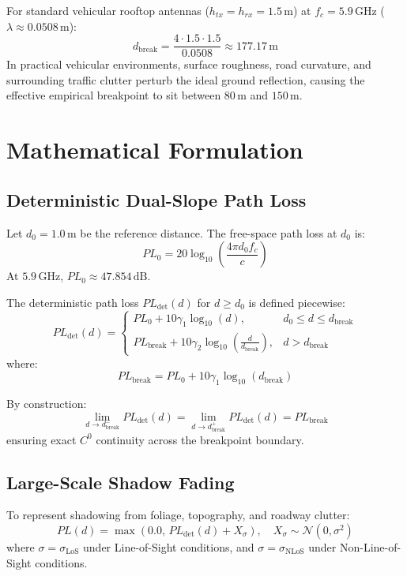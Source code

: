\documentclass[11pt,a4paper]{article}
\begin{document}
For standard vehicular rooftop antennas ($h_{tx} = h_{rx} = 1.5\,\text{m}$) at $f_c = 5.9\,\text{GHz}$ ($\lambda \approx 0.0508\,\text{m}$):
\begin{equation}
d_{\text{break}} = \frac{4 \cdot 1.5 \cdot 1.5}{0.0508} \approx 177.17\,\text{m}
\end{equation}
In practical vehicular environments, surface roughness, road curvature, and surrounding traffic clutter perturb the ideal ground reflection, causing the effective empirical breakpoint to sit between $80\,\text{m}$ and $150\,\text{m}$.

\section{Mathematical Formulation}

\subsection{Deterministic Dual-Slope Path Loss}
Let $d_0 = 1.0\,\text{m}$ be the reference distance. The free-space path loss at $d_0$ is:
\begin{equation}
PL_0 = 20 \log_{10}\left( \frac{4\pi d_0 f_c}{c} \right)
\end{equation}
At $5.9\,\text{GHz}$, $PL_0 \approx 47.854\,\text{dB}$.

The deterministic path loss $PL_{\text{det}}(d)$ for $d \ge d_0$ is defined piecewise:
\begin{equation}
PL_{\text{det}}(d) = \begin{cases}
PL_0 + 10 \gamma_1 \log_{10}(d), & d_0 \le d \le d_{\text{break}} \\
PL_{\text{break}} + 10 \gamma_2 \log_{10}\left( \frac{d}{d_{\text{break}}} \right), & d > d_{\text{break}}
\end{cases}
\end{equation}
where:
\begin{equation}
PL_{\text{break}} = PL_0 + 10 \gamma_1 \log_{10}(d_{\text{break}})
\end{equation}

By construction:
\begin{equation}
\lim_{d \to d_{\text{break}}^-} PL_{\text{det}}(d) = \lim_{d \to d_{\text{break}}^+} PL_{\text{det}}(d) = PL_{\text{break}}
\end{equation}
ensuring exact $C^0$ continuity across the breakpoint boundary.

\subsection{Large-Scale Shadow Fading}
To represent shadowing from foliage, topography, and roadway clutter:
\begin{equation}
PL(d) = \max\left( 0.0, \, PL_{\text{det}}(d) + X_\sigma \right), \quad X_\sigma \sim \mathcal{N}(0, \sigma^2)
\end{equation}
where $\sigma = \sigma_{\text{LoS}}$ under Line-of-Sight conditions, and $\sigma = \sigma_{\text{NLoS}}$ under Non-Line-of-Sight conditions.
\end{document}
